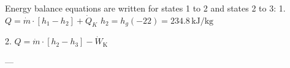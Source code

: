 Energy balance equations are written for states 1 to 2 and states 2 to 3:  
1. \( Q = \dot{m} \cdot [h_1 - h_2] + \dot{Q}_K \)  
   \( h_2 = h_g(-22) = 234.8 \, \text{kJ/kg} \)  

2. \( Q = \dot{m} \cdot [h_2 - h_3] - \dot{W}_\text{K} \)  

---